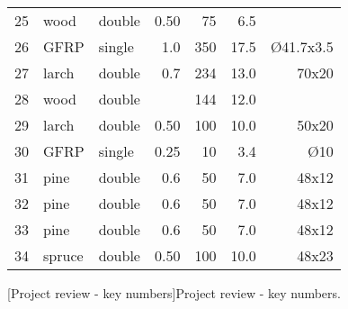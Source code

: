 \begin{table}[p]
\begin{fullpage}
\begin{tabularx}{\textwidth}{@{}lXl rrrr@{}}
25 & wood & double & 0.50 & 75 & 6.5 & \\
26 & GFRP & single & 1.0 & 350 & 17.5 & \O 41.7x3.5\\
27 & larch & double & 0.7 & 234 & 13.0 & 70x20\\
28 & wood & double &  & 144 & 12.0 & \\
29 & larch & double & 0.50 & 100 & 10.0 & 50x20\\
30 & GFRP & single & 0.25 & 10 & 3.4 & \O 10\\
31 & pine & double & 0.6 & 50 & 7.0 & 48x12\\
32 & pine & double & 0.6 & 50 & 7.0 & 48x12\\
33 & pine & double & 0.6 & 50 & 7.0 & 48x12\\
34 & spruce & double & 0.50 & 100 & 10.0 & 48x23\\
\bottomrule
 	\end{tabularx}
[Project review - key numbers]{Project review - key numbers.}
\end{fullpage}
\end{table}
